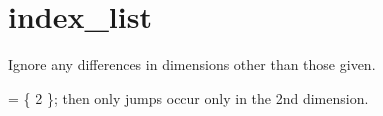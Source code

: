 \hypertarget{index__list-example}{
\section{index\_\-list}
}
Ignore any differences in dimensions other than those given.

= \{ 2 \}; then only jumps occur only in the 2nd dimension.


\begin{DoxyCodeInclude}
\end{DoxyCodeInclude}
 